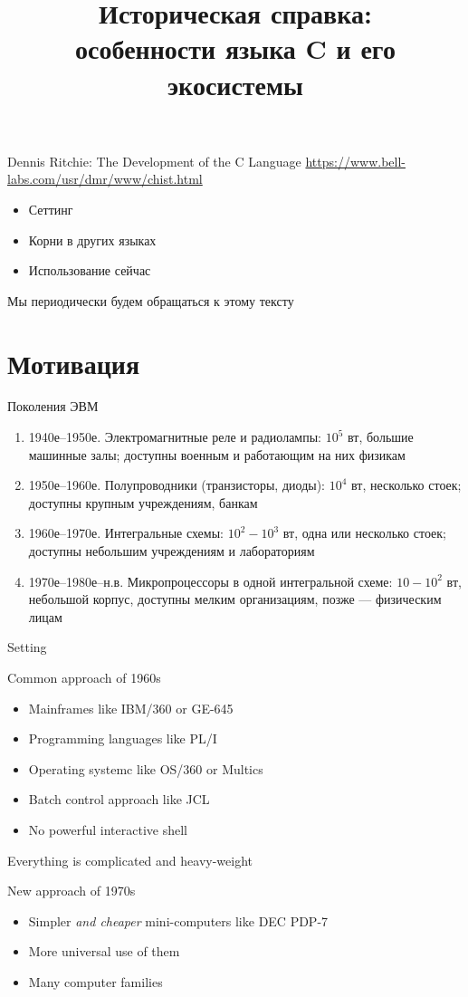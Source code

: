 \documentclass[xetex,aspectratio=169]{beamer}
\title[История C]{Историческая справка:\\особенности языка C и его экосистемы}
\begin{document}
\titleslide

\tocslide

\begin{frame}{Dennis Ritchie: The Development of the C Language}
	\url{https://www.bell-labs.com/usr/dmr/www/chist.html}
	\begin{itemize}
		\item Сеттинг
		\item Корни в других языках
		\item Использование сейчас
	\end{itemize}
	Мы периодически будем обращаться к этому тексту
\end{frame}

\section{Мотивация}

\begin{frame}{Поколения ЭВМ}
	\begin{enumerate}
		\item 1940е--1950е. Электромагнитные реле и радиолампы: $10^5$ вт, большие машинные залы; доступны военным и работающим на них физикам
		\item 1950е--1960е. Полупроводники (транзисторы, диоды): $10^4$ вт, несколько стоек; доступны крупным учреждениям, банкам
		\item 1960е--1970е. Интегральные схемы: $10^2-10^3$ вт, одна или несколько стоек; доступны небольшим учреждениям и лабораториям
		\item 1970е--1980е--н.в. Микропроцессоры в одной интегральной схеме: $10-10^2$ вт, небольшой корпус, доступны мелким организациям, позже --- физическим лицам
	\end{enumerate}
\end{frame}

\begin{frame}{Setting}
	\begin{block}{Common approach of 1960s}
		\begin{itemize}
			\item Mainframes like IBM/360 or GE-645
			\item Programming languages like PL/I
			\item Operating systemc like OS/360 or Multics
			\item Batch control approach like JCL
			\item No powerful interactive shell
		\end{itemize}
		Everything is complicated and heavy-weight
	\end{block}
\pause
	\begin{block}{New approach of 1970s}
	\begin{itemize}
		\item Simpler \emph{and cheaper} mini-computers like DEC PDP-7
		\item More universal use of them
		\item Many computer families
	\end{itemize}
\end{block}
\end{frame}
\end{document}
